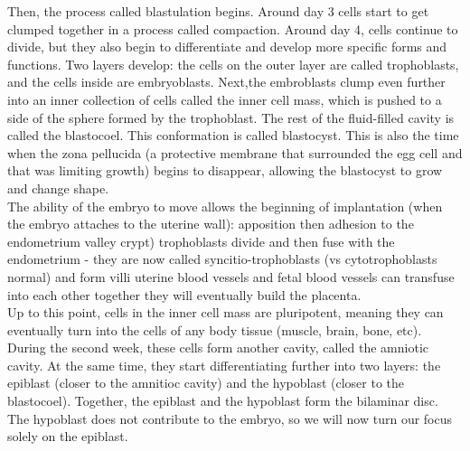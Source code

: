Then, the process called blastulation begins.
Around day 3 cells start to get clumped together in a process called compaction.
Around day 4, cells continue to divide, but they also begin to differentiate and develop more specific forms and functions.
Two layers develop: the cells on the outer layer are called trophoblasts, and the cells inside are embryoblasts. 
Next,the embroblasts clump even further into an inner collection of cells called the inner cell mass, which is pushed to a side of the sphere formed by the trophoblast.
The rest of the fluid-filled cavity is called the blastocoel.
This conformation is called blastocyst.
This is also the time when the zona pellucida (a protective membrane that surrounded the egg cell and that was limiting growth) begins to disappear, allowing the blastocyst to grow and change shape.\\

The ability of the embryo to move allows the beginning of implantation (when the embryo attaches to the uterine wall):
apposition then adhesion to the endometrium valley crypt)
trophoblasts divide and then fuse with the endometrium - they are now called syncitio-trophoblasts (vs cytotrophoblasts normal) and form villi
uterine blood vessels and fetal blood vessels can transfuse into each other 
together they will eventually build the placenta.\\

Up to this point, cells in the inner cell mass are pluripotent, meaning they can eventually turn into the cells of any body tissue (muscle, brain, bone, etc). 
During the second week, these cells form another cavity, called the amniotic cavity. 
At the same time, they start differentiating further into two layers: the epiblast (closer to the amnitioc cavity) and the hypoblast (closer to the blastocoel). 
Together, the epiblast and the hypoblast form the bilaminar disc.
The hypoblast does not contribute to the embryo, so we will now turn our focus solely on the epiblast.\\

